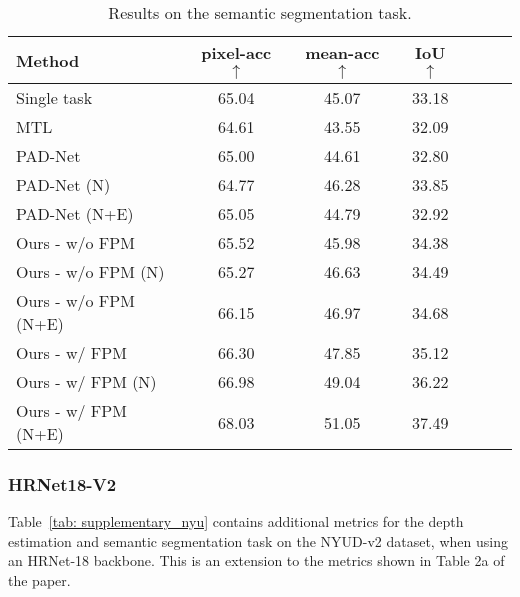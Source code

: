 \documentclass[runningheads]{llncs}
\begin{document}
\begin{table}[t]
\begin{subtable}{1.0\linewidth} 
\centering
\caption{Results on the semantic segmentation task.}
\label{tab: pascal_resnet50}
\footnotesize{
\begin{tabular}{|l|c|c|c|c|c|c|}
\hline
Method & pixel-acc $\uparrow$ & mean-acc $\uparrow$ & IoU  $\uparrow$ \\
\hline
Single task & 65.04 & 45.07 & 33.18 \\
MTL & 64.61 & 43.55 & 32.09 \\
PAD-Net & 65.00 & 44.61 & 32.80 \\
PAD-Net (N) & 64.77 & 46.28 & 33.85 \\
PAD-Net (N+E) & 65.05 & 44.79 & 32.92 \\
\hline
Ours - w/o FPM & 65.52 & 45.98 & 34.38 \\
Ours - w/o FPM (N) & 65.27 & 46.63 & 34.49 \\
Ours - w/o FPM (N+E) & 66.15 & 46.97 & 34.68 \\
\hline
Ours - w/ FPM & 66.30 & 47.85 & 35.12 \\
Ours - w/ FPM (N) & 66.98 & 49.04 & 36.22 \\
Ours - w/ FPM (N+E) & 68.03 & 51.05 & 37.49 \\
\hline
\end{tabular}}
\end{subtable}\end{table}

\subsubsection{HRNet18-V2}
\label{subsec: supl_nyud_hr18}
Table~\ref{tab: supplementary_nyu} contains additional metrics for the depth estimation and semantic segmentation task on the NYUD-v2 dataset, when using an HRNet-18 backbone. This is an extension to the metrics shown in Table 2a of the paper.
\end{document}

